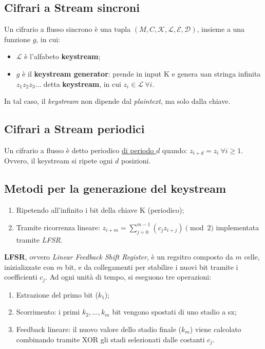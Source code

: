 \subsection{Cifrari a Stream sincroni}

Un cifrario a flusso sincrono è una tupla $(M, C, \mathcal{K}, \mathcal{L}, \mathcal{E}, \mathcal{D})$, insieme a una funzione $g$, in cui:

\begin{itemize}
    \item $\mathcal{L}$ è l'alfabeto \textbf{keystream};
    \item $g$ è il \textbf{keystream generator}: prende in input K e genera uan stringa infinita $z_1z_2z_3\dots$ detta \textbf{keystream}, in cui $z_i \in \mathcal{L} \ \forall i$. 
\end{itemize}

\noindent In tal caso, il \textit{keystream} non dipende dal \textit{plaintext}, ma solo dalla chiave. 

\subsection{Cifrari a Stream periodici}
Un cifrario a flusso è detto periodico \underline{di periodo $d$} quando:
$z_{i+d}=z_i \ \forall i \geq 1$. 
Ovvero, il keystream si ripete ogni $d$ posizioni. 


\subsection{Metodi per la generazione del keystream}
\begin{enumerate}
    \item Ripetendo all'infinito i bit della chiave K (periodico);
    \item Tramite ricorrenza lineare: $z_{i+m}=\sum_{j=0}^{m-1}(c_jz_{i+j}) \pmod 2$ implementata tramite \textit{LFSR}. 
\end{enumerate}

\noindent \textbf{LFSR}, ovvero \textit{Linear Feedback Shift Register}, è un regsitro composto da $m$ celle, inizializzate con $m$ bit, e da collegamenti per stabilire i nuovi bit tramite i coefficienti $c_j$. Ad ogni unità di tempo, si eseguono tre operazioni: 
\begin{enumerate}
    \item Estrazione del primo bit ($k_1$);
    \item Scorrimento: i primi $k_2, \dots, k_m$ bit vengono spostati di uno stadio a sx;
    \item Feedback lineare: il nuovo valore dello stadio finale ($k_m$) viene calcolato combinando tramite XOR gli stadi selezionati dalle costanti $c_j$. 
\end{enumerate}

